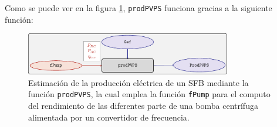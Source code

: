 Como se puede ver en la figura \ref{fig:prodpvps}, \texttt{prodPVPS} funciona gracias a la siguiente función:
\begin{figure}[htbp]
\centering
\includegraphics[keepaspectratio,width=0.8\textwidth,height=0.5\textheight]{figuras/prodpvps.pdf}
\caption{Estimación de la producción eléctrica de un SFB mediante la función \texttt{prodPVPS}, la cual emplea la función \texttt{fPump} para el computo del rendimiento de las diferentes parte de una bomba centrífuga alimentada por un convertidor de frecuencia. \label{fig:prodpvps}}
\end{figure}
